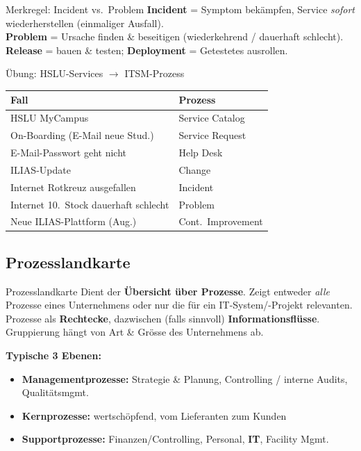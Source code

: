 \documentclass[a4paper, fontsize=7pt]{scrartcl}
\renewcommand*{\arraystretch}{1.5}  %
\begin{document}
\begin{subbox}{Merkregel: Incident vs.\ Problem}
\textbf{Incident} = Symptom bekämpfen, Service \emph{sofort} wiederherstellen
(einmaliger Ausfall).\\
\textbf{Problem} = Ursache finden \& beseitigen (wiederkehrend / dauerhaft
schlecht).\\
\textbf{Release} = bauen \& testen; \textbf{Deployment} = Getestetes ausrollen.
\end{subbox}

\begin{subbox}{Übung: HSLU-Services $\to$ ITSM-Prozess}
\renewcommand*{\arraystretch}{1.15}
\begin{tabularx}{\linewidth}{@{}>{\raggedright\arraybackslash}X|l@{}}
\textbf{Fall} & \textbf{Prozess} \\
\hline
HSLU MyCampus & Service Catalog \\
On-Boarding (E-Mail neue Stud.) & Service Request \\
E-Mail-Passwort geht nicht & Help Desk \\
ILIAS-Update & Change \\
Internet Rotkreuz ausgefallen & Incident \\
Internet 10.\ Stock dauerhaft schlecht & Problem \\
Neue ILIAS-Plattform (Aug.) & Cont.\ Improvement \\
\end{tabularx}
\end{subbox}

\subsection{Prozesslandkarte}

\begin{mainbox}{Prozesslandkarte}
Dient der \textbf{Übersicht über Prozesse}. Zeigt entweder \emph{alle}
Prozesse eines Unternehmens oder nur die für ein IT-System/-Projekt
relevanten. Prozesse als \textbf{Rechtecke}, dazwischen (falls sinnvoll)
\textbf{Informationsflüsse}. Gruppierung hängt von Art \& Grösse des
Unternehmens ab.

\textbf{Typische 3 Ebenen:}
\begin{itemize}
    \item \textbf{Managementprozesse:} Strategie \& Planung, Controlling /
          interne Audits, Qualitätsmgmt.
    \item \textbf{Kernprozesse:} wertschöpfend, vom Lieferanten zum Kunden
    \item \textbf{Supportprozesse:} Finanzen/Controlling, Personal,
          \textbf{IT}, Facility Mgmt.
\end{itemize}
\end{mainbox}
\end{document}
